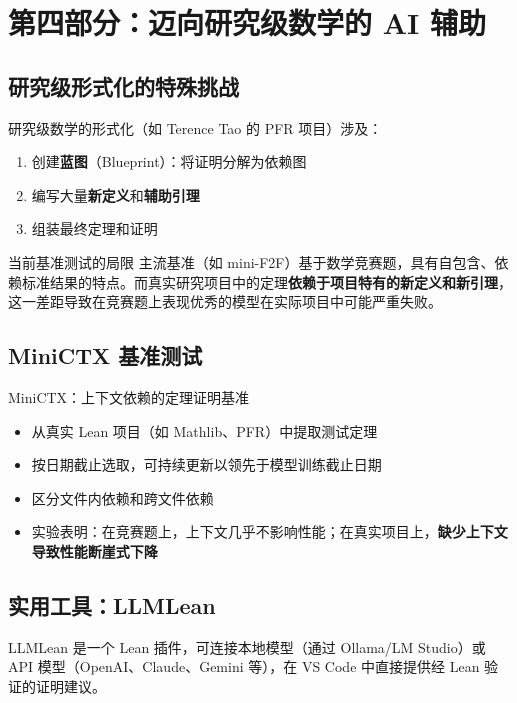 \section{第四部分：迈向研究级数学的 AI 辅助}

\subsection{研究级形式化的特殊挑战}

研究级数学的形式化（如 Terence Tao 的 PFR 项目）涉及：
\begin{enumerate}
    \item 创建\textbf{蓝图}（Blueprint）：将证明分解为依赖图
    \item 编写大量\textbf{新定义}和\textbf{辅助引理}
    \item 组装最终定理和证明
\end{enumerate}

\begin{warningbox}{当前基准测试的局限}
主流基准（如 mini-F2F）基于数学竞赛题，具有自包含、依赖标准结果的特点。而真实研究项目中的定理\textbf{依赖于项目特有的新定义和新引理}，这一差距导致在竞赛题上表现优秀的模型在实际项目中可能严重失败。
\end{warningbox}

\subsection{MiniCTX 基准测试}

\begin{importantbox}{MiniCTX：上下文依赖的定理证明基准}
\begin{itemize}
    \item 从真实 Lean 项目（如 Mathlib、PFR）中提取测试定理
    \item 按日期截止选取，可持续更新以领先于模型训练截止日期
    \item 区分文件内依赖和跨文件依赖
    \item 实验表明：在竞赛题上，上下文几乎不影响性能；在真实项目上，\textbf{缺少上下文导致性能断崖式下降}
\end{itemize}
\end{importantbox}

\subsection{实用工具：LLMLean}

LLMLean 是一个 Lean 插件，可连接本地模型（通过 Ollama/LM Studio）或 API 模型（OpenAI、Claude、Gemini 等），在 VS Code 中直接提供经 Lean 验证的证明建议。

